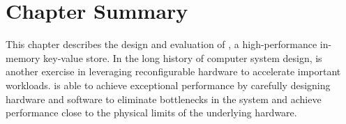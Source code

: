 \section{Chapter Summary}
\label{kvdirect:sec:conclusion}

This chapter describes the design and evaluation of \oursys{}, a high-performance in-memory key-value store. In the long history of computer system design, \oursys{} is another exercise in leveraging reconfigurable hardware to accelerate important workloads. \oursys{} is able to achieve exceptional performance by carefully designing hardware and software to eliminate bottlenecks in the system and achieve performance close to the physical limits of the underlying hardware.
